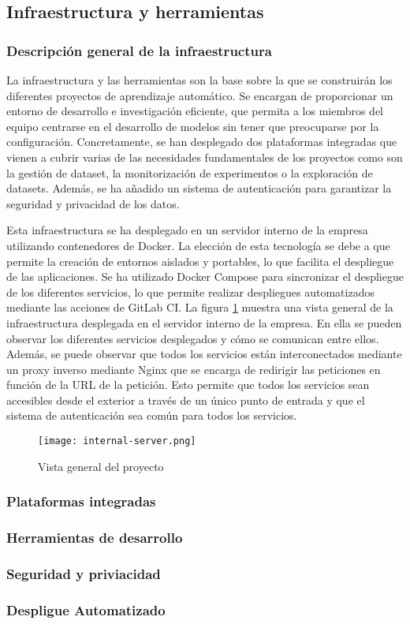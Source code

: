 \subsection{Infraestructura y herramientas}
\subsubsection{Descripción general de la infraestructura}
La infraestructura y las herramientas son la base sobre la que se construirán
los diferentes proyectos de aprendizaje automático. Se encargan de proporcionar
un entorno de desarrollo e investigación eficiente, que permita a los miembros
del equipo centrarse en el desarrollo de modelos sin tener que preocuparse por
la configuración. Concretamente, se han desplegado dos plataformas integradas
que vienen a cubrir varias de las necesidades fundamentales de los proyectos
como son la gestión de dataset, la monitorización de experimentos o la
exploración de datasets. Además, se ha añadido un sistema de autenticación 
para garantizar la seguridad y privacidad de los datos.\medskip

Esta infraestructura se ha desplegado en un servidor interno de la empresa
utilizando contenedores de Docker. La elección de esta tecnología se debe a
que permite la creación de entornos aislados y portables, lo que facilita el
despliegue de las aplicaciones. Se ha utilizado Docker Compose para
sincronizar el despliegue de los diferentes servicios, lo que permite
realizar despliegues automatizados mediante las acciones de GitLab CI. La
figura \ref{fig:internal-server} muestra una vista general de la infraestructura
desplegada en el servidor interno de la empresa. En ella se pueden observar
los diferentes servicios desplegados y cómo se comunican entre ellos. Además,
se puede observar que todos los servicios están interconectados mediante un
proxy inverso mediante Nginx que se encarga de redirigir las peticiones en 
función de la URL de la petición. Esto permite que todos los servicios sean
accesibles desde el exterior a través de un único punto de entrada y que el
sistema de autenticación sea común para todos los servicios.

\begin{figure}[ht]
    \centering
    \texttt{[image: internal-server.png]}
    \caption{Vista general del proyecto}\label{fig:internal-server}
\end{figure}

\subsubsection{Plataformas integradas}


\subsubsection{Herramientas de desarrollo}
\subsubsection{Seguridad y priviacidad}
\subsubsection{Despligue Automatizado}